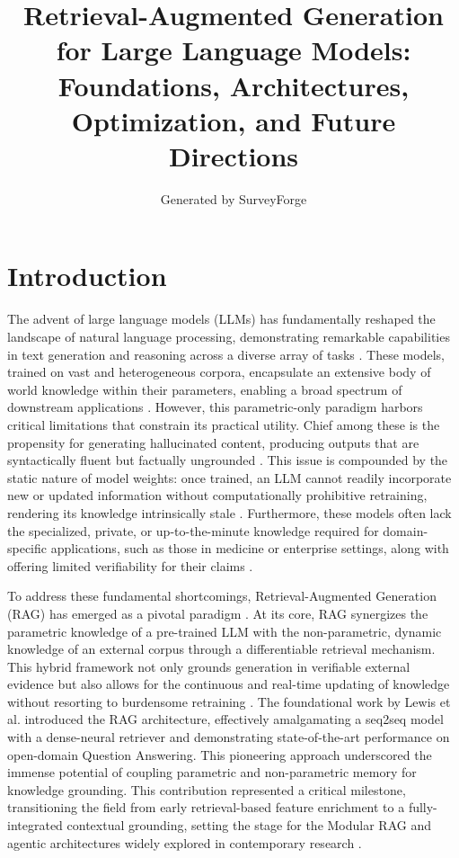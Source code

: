 \documentclass[11pt,a4paper]{article}
\title{Retrieval-Augmented Generation for Large Language Models: Foundations, Architectures, Optimization, and Future Directions}
\author{Generated by SurveyForge}
\date{}
\begin{document}
\maketitle
\tableofcontents
\newpage



\section{Introduction}


The advent of large language models (LLMs) has fundamentally reshaped the landscape of natural language processing, demonstrating remarkable capabilities in text generation and reasoning across a diverse array of tasks \cite{arxiv:2410.12837v1,arxiv:2312.10997v5}. These models, trained on vast and heterogeneous corpora, encapsulate an extensive body of world knowledge within their parameters, enabling a broad spectrum of downstream applications \cite{arxiv:2005.11401v4}. However, this parametric-only paradigm harbors critical limitations that constrain its practical utility. Chief among these is the propensity for generating hallucinated content, producing outputs that are syntactically fluent but factually ungrounded \cite{arxiv:2309.01431v2}. This issue is compounded by the static nature of model weights: once trained, an LLM cannot readily incorporate new or updated information without computationally prohibitive retraining, rendering its knowledge intrinsically stale \cite{arxiv:2404.10981v1}. Furthermore, these models often lack the specialized, private, or up-to-the-minute knowledge required for domain-specific applications, such as those in medicine or enterprise settings, along with offering limited verifiability for their claims \cite{arxiv:2406.12449v1,arxiv:2601.05264v1}.

To address these fundamental shortcomings, Retrieval-Augmented Generation (RAG) has emerged as a pivotal paradigm \cite{arxiv:2312.10997v5}. At its core, RAG synergizes the parametric knowledge of a pre-trained LLM with the non-parametric, dynamic knowledge of an external corpus through a differentiable retrieval mechanism. This hybrid framework not only grounds generation in verifiable external evidence but also allows for the continuous and real-time updating of knowledge without resorting to burdensome retraining \cite{arxiv:2312.10997v5,arxiv:2404.10981v1}. The foundational work by Lewis et al. \cite{arxiv:2005.11401v4} introduced the RAG architecture, effectively amalgamating a seq2seq model with a dense-neural retriever and demonstrating state-of-the-art performance on open-domain Question Answering. This pioneering approach underscored the immense potential of coupling parametric and non-parametric memory for knowledge grounding. This contribution represented a critical milestone, transitioning the field from early retrieval-based feature enrichment to a fully-integrated contextual grounding, setting the stage for the Modular RAG and agentic architectures widely explored in contemporary research \cite{arxiv:2405.06211v3,arxiv:2312.10997v5}.
\end{document}
